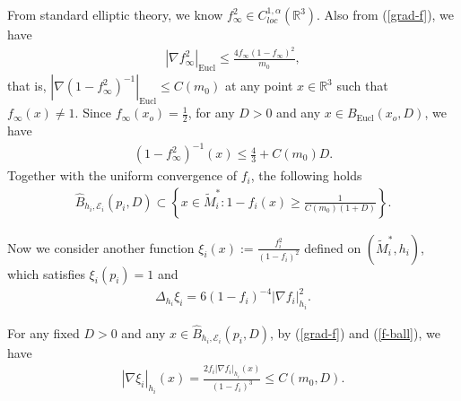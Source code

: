 \documentclass[letter]{amsart}
\theoremstyle{definition}
\theoremstyle{remark}
\begin{document}
From standard elliptic theory, we know $f_\infty^2 \in C^{1,\alpha }_{loc}(\mathbb{R}^3)$. Also from (\ref{grad-f}), we have
\begin{align*}
	|\nabla f_\infty^2|_{\mathrm{Eucl}} \leq \frac{4 f_\infty(1-f_\infty)^2}{m_0},
\end{align*}
that is, $\left|\nabla (1- f_\infty^2)^{-1}\right|_{\mathrm{Eucl}} \leq C(m_0)$ at any point $x \in \mathbb{R}^3$ such that $f_\infty(x) \neq 1$.
Since $f_\infty(x_o) = \frac{1}{2}$, for any $D>0$ and any $x \in B_{\mathrm{Eucl}}(x_o, D)$, we have
\begin{align*}
	(1- f_\infty^2)^{-1}(x) \leq \frac{4}{3} + C(m_0) D.
\end{align*}
Together with the uniform convergence of $f_i$, the following holds 
\begin{align}\label{f-ball}
	\hat{B}_{h_i, \mathcal{E}_i}(p_i, D) \subset \left\{x \in \tilde{M}_i^* : 1- f_i(x) \geq  \frac{1}{C(m_0)(1+D)} \right\}.
\end{align}

Now we consider another function $\xi _i(x):=\frac{f_i^2}{(1-f_i)^2}$ defined on $(\tilde{M}^*_i, h_i)$, which satisfies $\xi _i(p_i) =1$ and
\begin{align}\label{xi-eq}
	\Delta _{h_i} \xi _i = 6 (1-f_i)^{-4}|\nabla f_i|_{h_i}^2.
\end{align}

For any fixed $D>0$ and any $x \in \hat{B}_{h_i, \mathcal{E}_i}(p_i, D)$, by (\ref{grad-f}) and (\ref{f-ball}), we have 
\begin{align}\label{nbl-xi}
|\nabla \xi _i|_{h_i}(x) = \frac{2 f_i |\nabla f_i|_{h_i}(x)}{(1-f_i)^{3}}\leq C(m_0,D).
\end{align}
\end{document}
